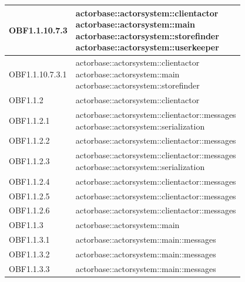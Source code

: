 \documentclass{scalatekids-article}
\begin{document}
\begin{longtable}[H]{|p{3.5cm}|p{7.5cm}|}
  \hline
  OBF1.1.10.7.3 & \multiLineCell[t]{actorbase::actorsystem::clientactor\\actorbase::actorsystem::main\\actorbase::actorsystem::storefinder\\actorbase::actorsystem::userkeeper\\}\\
  \hline
  OBF1.1.10.7.3.1 & \multiLineCell[t]{actorbase::actorsystem::clientactor\\actorbase::actorsystem::main\\actorbase::actorsystem::storefinder\\}\\
  \hline
  OBF1.1.2 & \multiLineCell[t]{actorbase::actorsystem::clientactor\\}\\
  \hline
  OBF1.1.2.1 & \multiLineCell[t]{actorbase::actorsystem::clientactor::messages\\actorbase::actorsystem::serialization\\}\\
  \hline
  OBF1.1.2.2 & \multiLineCell[t]{actorbase::actorsystem::clientactor::messages\\}\\
  \hline
  OBF1.1.2.3 & \multiLineCell[t]{actorbase::actorsystem::clientactor::messages\\actorbase::actorsystem::serialization\\}\\
  \hline
  OBF1.1.2.4 & \multiLineCell[t]{actorbase::actorsystem::clientactor::messages\\}\\
  \hline
  OBF1.1.2.5 & \multiLineCell[t]{actorbase::actorsystem::clientactor::messages\\}\\
  \hline
  OBF1.1.2.6 & \multiLineCell[t]{actorbase::actorsystem::clientactor::messages\\}\\
  \hline
  OBF1.1.3 & \multiLineCell[t]{actorbase::actorsystem::main\\}\\
  \hline
  OBF1.1.3.1 & \multiLineCell[t]{actorbase::actorsystem::main::messages\\}\\
  \hline
  OBF1.1.3.2 & \multiLineCell[t]{actorbase::actorsystem::main::messages\\}\\
  \hline
  OBF1.1.3.3 & \multiLineCell[t]{actorbase::actorsystem::main::messages\\}\\

\end{longtable}
\end{document}
